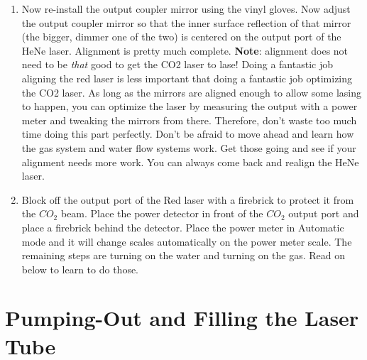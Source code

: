 \documentclass{../lab}
\begin{document}
\begin{enumerate}
    \item Now re-install the output coupler mirror using the vinyl gloves. Now adjust the output coupler mirror so that the inner surface reflection of that mirror (the bigger, dimmer one of the two) is centered on the output port of the HeNe laser. Alignment is pretty much complete. \textbf{Note}: alignment does not need to be \emph{that} good to get the CO2 laser to lase! Doing a fantastic job aligning the red laser is less important that doing a fantastic job optimizing the CO2 laser. As long as the mirrors are aligned enough to allow some lasing to happen, you can optimize the laser by measuring the output with a power meter and tweaking the mirrors from there. Therefore, don't waste too much time doing this part perfectly. Don't be afraid to move ahead and learn how the gas system and water flow systems work. Get those going and see if your alignment needs more work. You can always come back and realign the HeNe laser.
    \item Block off the output port of the Red laser with a firebrick to protect it from the $CO_2 $ beam. Place the power detector in front of the $CO_2 $ output port and place a firebrick behind the detector. Place the power meter in Automatic mode and it will change scales automatically on the power meter scale. The remaining steps are turning on the water and turning on the gas. Read on below to learn to do those.
\end{enumerate}

\section{Pumping-Out and Filling the Laser Tube }
\end{document}
